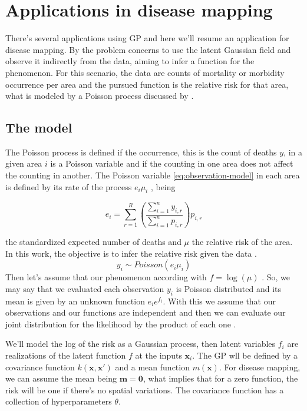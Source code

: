 \section{Applications in disease mapping}
There's several applications using GP and here we'll resume an application for disease mapping. By \cite{Vanhatalo2010Vehtari} the problem concerns to use the latent Gaussian field and observe it indirectly from the data, aiming to infer a function for the phenomenon. For this scenario, the data are counts of mortality or morbidity occurrence per area and the pursued function is the relative risk for that area, what is modeled by a Poisson process discussed by \cite{Best2005}.

\subsection{The model}

The Poisson process is defined if the occurrence, this is the count of deaths $y$, in a given area $i$ is a Poisson variable and if the counting in one area does not affect the counting in another. The Poisson variable \ref{eq:observation-model} in each area is defined by its rate of the process $e_i\mu_i$ \cite{Best2005,Samat2012}, being 

\begin{equation}
    e_{i}=\sum_{r=1}^{R}\left(\frac{\sum_{i=1}^{n} y_{i, r}}{\sum_{i=1}^{n} p_{i, r}}\right) p_{i, r}
    \label{eq:standized-num-death}
\end{equation}

the standardized expected number of deaths and $\mu$ the relative risk of the area. In this work, the objective is to infer the relative risk given the data \cite{lawson2013statistical}. 
%
\begin{equation}
    y_i \sim Poisson(e_i\mu_i)
    \label{eq:observation-model}
\end{equation}
%
Then let's assume that our phenomenon according with $f=\log (\mu)$ \cite{Best2005}. So, we may say that we evaluated each observation $y_i$ is Poisson distributed and its mean is given by an unknown function $e_i e^{f_i}$. With this we assume that our observations and our functions are independent and then we can evaluate our joint distribution for the likelihood by the product of each one \cite{jarno2010}.

We'll model the log of the risk as a Gaussian process, then latent variables $f_i$ are realizations of the latent function $f$ at the inputs $\mathbf{x}_i$. The GP wll be defined by a covariance function $k(\mathbf{x},\mathbf{x}')$ and a mean function $m(\mathbf{x})$. For disease mapping, we can assume the mean being $\mathbf{m}=\mathbf{0}$, what implies that for a zero function, the risk will be one if there's no spatial variations. The covariance function has a collection of hyperparameters $\theta$.

